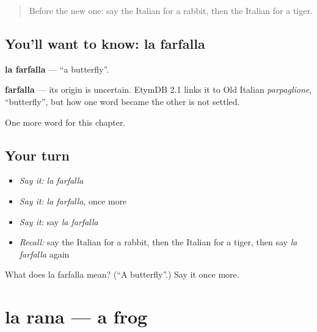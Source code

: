 \label{lesson:IT-C120-farfalla}



\begin{quote}
Before the new one: say the Italian for a rabbit, then the Italian for a tiger.
\end{quote}

\subsection*{You'll want to know: la farfalla}
\textbf{la farfalla} — \textquotedblleft{}a butterfly\textquotedblright{}.

\begin{cousinweb}
\textbf{farfalla} — its origin is uncertain. EtymDB 2.1 links it to Old Italian \emph{parpaglione}, \textquotedblleft{}butterfly\textquotedblright{}, but how one word became the other is not settled.
\end{cousinweb}

\begin{grammarlens}[title={What you've built}]
One more word for this chapter.
\end{grammarlens}

\subsection*{Your turn}
\begin{itemize}
\raggedright
  \item \emph{Say it:} \emph{la farfalla}
  \item \emph{Say it:} \emph{la farfalla}, once more
  \item \emph{Say it:} say \emph{la farfalla}
  \item \emph{Recall:} say the Italian for a rabbit, then the Italian for a tiger, then say \emph{la farfalla} again
\end{itemize}

\begin{tcolorbox}[breakable,colback=teal!4,colframe=teal!35!black,title={Before you move on}]
What does la farfalla mean? (\textquotedblleft{}A butterfly\textquotedblright{}.) Say it once more.
\end{tcolorbox}
\section[la rana]{la rana — a frog}

\label{lesson:IT-C120-rana}



